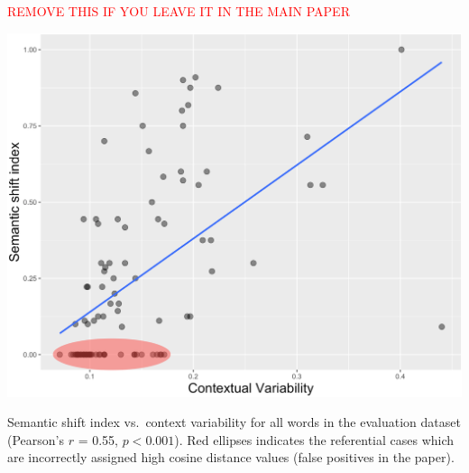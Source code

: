 \documentclass[11pt,a4paper]{article}
\begin{document}
\begin{minipage}{15cm}

\textcolor{red}{REMOVE THIS IF YOU LEAVE IT IN THE MAIN PAPER}

\includegraphics[width=\columnwidth]{images/contextual_variability_shift_index_annotated.png}

\vspace*{0.25cm}

Semantic shift index vs.~context variability for all words in the evaluation dataset (Pearson's $r$ = 0.55, $p< 0.001$). Red ellipses indicates the referential cases which are incorrectly assigned high cosine distance values (false positives in the paper).


\end{minipage}

\pagebreak

\clearpage




\end{document}
